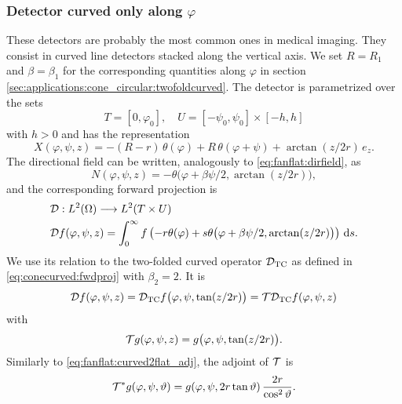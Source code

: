 \documentclass{amsart}
\renewcommand*{\phi}{\varphi}
\begin{document}
\subsubsection{Detector curved only along $\phi$}
\label{sec:applications:cone_circular:curvedstack}

These detectors are probably the most common ones in medical imaging. They consist in curved line detectors stacked along the vertical 
axis. We set $R = R_1$ and $\beta = \beta_1$ for the corresponding quantities along $\phi$ in section 
\ref{sec:applications:cone_circular:twofoldcurved}. The detector is parametrized over the sets
%
\begin{equation}
 \label{eq:conestack:params}
 T = [0, \phi_0],\quad U = [-\psi_0, \psi_0] \times [-h, h]
\end{equation}
%
with $h>0$ and has the representation
%
\begin{equation}
 \label{eq:conestack:detector_parametr}
 X(\phi, \psi, z) = -(R - r)\, \theta(\phi) + R\, \theta(\phi + \psi) + \arctan(z/2r)\, e_z.
\end{equation}
%
The directional field can be written, analogously to \eqref{eq:fanflat:dirfield}, as
%
\begin{equation}
 \label{eq:conestack:dirfield}
 N(\phi, \psi, z) = -\theta\big( \phi + \beta\psi/2, \arctan(z/2r) \big),
\end{equation} 
%
and the corresponding forward projection is
%
\begin{align}
 &\OPD: L^2(\Omega) \Lto L^2(T \times U) \notag \\
 &\OPD f(\phi, \psi, z) = \int_0^\infty f\left( -r\theta(\phi) + s \theta\big( \phi + \beta\psi/2, \arctan(z/2r) \big) \right)\, \D s.
\end{align}
%
We use its relation to the two-folded curved operator ${\mathcal{D}}_{\mathrm{TC}}$ as defined in \eqref{eq:conecurved:fwdproj} with $\beta_2 = 2$. 
It is
%
\begin{equation*}
 \OPD f(\phi, \psi, z) = \OPD_{\mathrm{TC}} f\big(\phi, \psi, \tan(z/2r)\big) = \OPT \OPD_{\mathrm{TC}} f(\phi, \psi, z)
\end{equation*}
%
with
%
\begin{equation}
 \label{eq:conestack:curved2flat}
 \OPT g(\phi, \psi, z) = g\big(\phi, \psi, \tan(z/2r)\big).
\end{equation}
%
%
Similarly to \eqref{eq:fanflat:curved2flat_adj}, the adjoint of ${\mathcal{T}}$ is
%
\begin{equation}
 \label{eq:conestack:curved2flat_adj}
 \DUALOPT g(\phi, \psi, \vartheta) = g(\phi, \psi, 2r\tan\vartheta)\, \frac{2r}{\cos^2\vartheta}.
\end{equation}
\end{document}
